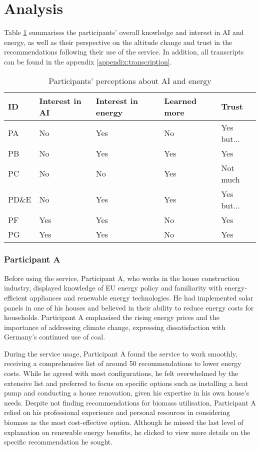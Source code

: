 \section{Analysis}

Table \ref{tab:participants_perceptions} summarises the participants' overall knowledge and interest in AI and energy, 
as well as their perspective on the altitude change and trust in the recommendations following their use of the service.  
In addition, all transcripts can be found in the appendix \ref{appendix:transcription}.

\begin{table}[h!]
  \centering
  \begin{tabular}{ | p{} | p{} | p{} | p{} | p{} | } 
    \hline
    ID & Interest in AI & Interest in energy & Learned more & Trust \\
    \hline
    PA & No & Yes & No & Yes but... \\
    \hline
    PB & No & Yes & Yes & Yes \\
    \hline
    PC & No & No & Yes & Not much \\
    \hline
    PD\&E & No & Yes & Yes & Yes but... \\
    \hline
    PF & Yes & Yes & No & Yes \\
    \hline
    PG & Yes & Yes & No & Yes \\
    \hline
  \end{tabular}
  \caption{Participants' perceptions about AI and energy}
  \label{tab:participants_perceptions}
\end{table}


\subsubsection{Participant A}

Before using the service, 
Participant A, who works in the house construction industry, 
displayed knowledge of EU energy policy and familiarity with energy-efficient appliances and renewable energy technologies. 
He had implemented solar panels in one of his houses and believed in their ability to reduce energy costs for households. 
Participant A emphasised the rising energy prices and the importance of addressing climate change, expressing dissatisfaction with Germany's continued use of coal. 

During the service usage, 
Participant A found the service to work smoothly, receiving a comprehensive list of around 50 recommendations to lower energy costs. 
While he agreed with most configurations, he felt overwhelmed by the extensive list and preferred to focus on specific options such as installing a heat pump and conducting a house renovation, given his expertise in his own house's needs. 
Despite not finding recommendations for biomass utilisation, Participant A relied on his professional experience and personal resources in considering biomass as the most cost-effective option. 
Although he missed the last level of explanation on renewable energy benefits, he clicked to view more details on the specific recommendation he sought.

